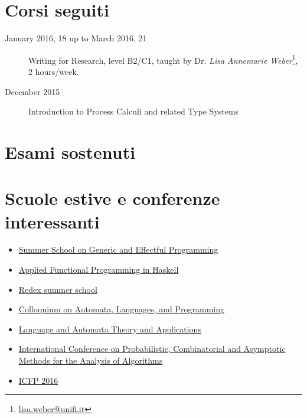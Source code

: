 \documentclass[11pt]{article}
\begin{document}
\section*{Corsi seguiti}

\begin{description}

\item[January 2016, 18 up to March 2016, 21] Writing for Research, level B2/C1, 
    taught by Dr. \emph{Lisa Annemarie Weber}\footnote{\url{lisa.weber@unifi.it}},
    2 hours/week.
\item[December 2015] Introduction to Process Calculi and related Type Systems

\item[%
] 

\end{description}

\section*{Esami sostenuti}

\begin{description}

\item[%
] 

\item[%
] 

\end{description}

\section*{Scuole estive e conferenze interessanti}

\begin{itemize}
    \item \href{https://www.cs.ox.ac.uk/projects/utgp/school/index.html}
        {Summer School on Generic and Effectful Programming}
    \item \href{http://www.utrechtsummerschool.nl/courses/science/applied-functional-programming-in-haskell}
        {Applied Functional Programming in Haskell}
    \item \href{http://redex.racket-lang.org/summer-school.html}{Redex summer school}
    \item \href{http://www.easyconferences.eu/icalp2016/}{Colloquium on Automata, Languages, and Programming}
    \item \href{http://grammars.grlmc.com/LATA2016/}{Language and Automata Theory and Applications}
    \item \href{http://www.aofa2016.meetings.pl/}{International Conference on Probabilistic, Combinatorial and Asymptotic Methods 
    for the Analysis of Algorithms}
    \item \href{http://conf.researchr.org/home/icfp-2016}{ICFP 2016}
\end{itemize}
\end{document}
